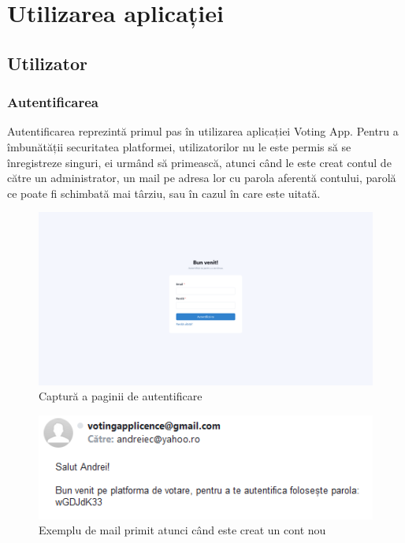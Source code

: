 \chapter{Utilizarea aplicației}

\section{Utilizator}
\subsection{Autentificarea}

Autentificarea reprezintă primul pas în utilizarea aplicației Voting App. Pentru a îmbunătății securitatea platformei, utilizatorilor nu le este permis să se înregistreze singuri, ei urmând să primească, atunci când le este creat contul de către un administrator, un mail pe adresa lor cu parola aferentă contului, parolă ce poate fi schimbată mai târziu, sau în cazul în care este uitată.

\begin{figure}[!ht]
    \centering
    \includegraphics[width=145mm]{images/page_login.png}
    \caption{Captură a paginii de autentificare}
\end{figure}

\begin{figure}[!ht]
    \centering
    \includegraphics[width=115mm]{images/example_mail_register.png}
    \caption{Exemplu de mail primit atunci când este creat un cont nou}
\end{figure}


